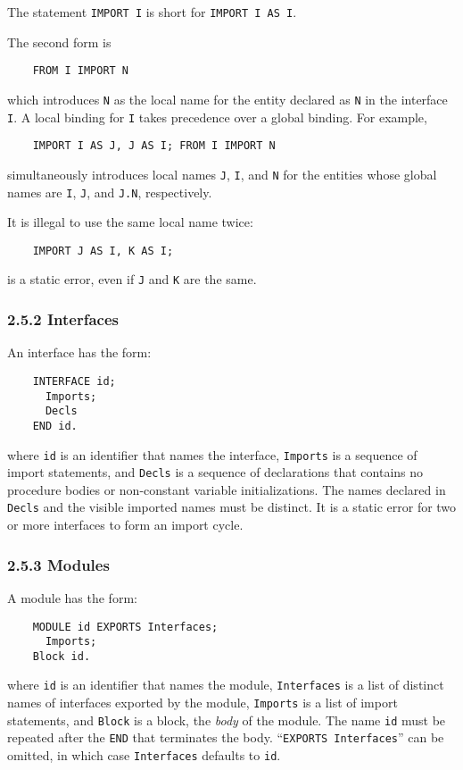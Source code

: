 \documentclass[10pt]{article}
\begin{document}
The statement \verb|IMPORT I| is short for \verb|IMPORT I AS I|.

The second form is
\begin{verbatim}
    FROM I IMPORT N
\end{verbatim}
which introduces \verb|N| as the local name for the entity declared as
\verb|N| in the interface \verb|I|.  A local binding for \verb|I| takes
precedence over a global binding.  For example,
\begin{verbatim}
    IMPORT I AS J, J AS I; FROM I IMPORT N
\end{verbatim}
simultaneously introduces local names \verb|J|, \verb|I|, and \verb|N| for the
entities whose global names are \verb|I|, \verb|J|, and \verb|J.N|,
respectively.

It is illegal to use the same local name twice:
\begin{verbatim}
    IMPORT J AS I, K AS I;
\end{verbatim}
is a static error, even if \verb|J| and \verb|K| are the same.

\subsubsection*{2.5.2 Interfaces}

An interface has the form:
\begin{verbatim}
    INTERFACE id;
      Imports;
      Decls
    END id.
\end{verbatim}
where \verb|id| is an identifier that names the interface, \verb|Imports| is a
sequence of import statements, and \verb|Decls| is a sequence of declarations
that contains no procedure bodies or non-constant variable initializations.
The names declared in \verb|Decls| and the visible imported names must be
distinct.  It is a static error for two or more interfaces to form an import
cycle.

\subsubsection*{2.5.3 Modules}

A module has the form:
\begin{verbatim}
    MODULE id EXPORTS Interfaces;
      Imports;
    Block id.
\end{verbatim}
where \verb|id| is an identifier that names the module, \verb|Interfaces| is a
list of distinct names of interfaces exported by the module, \verb|Imports| is
a list of import statements, and \verb|Block| is a block, the \emph{body} of
the module.  The name \verb|id| must be repeated after the \verb|END| that
terminates the body.  ``\verb|EXPORTS Interfaces|'' can be omitted, in which
case \verb|Interfaces| defaults to \verb|id|.
\end{document}
